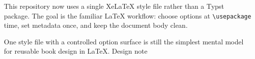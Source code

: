 This repository now uses a single XeLaTeX style file rather than a Typst
package. The goal is the familiar LaTeX workflow: choose options at
\verb|\usepackage| time, set metadata once, and keep the document body clean.

\vspace{1.5em}
\bookepigraph
  {One style file with a controlled option surface is still the simplest mental
  model for reusable book design in LaTeX.}
  {Design note}